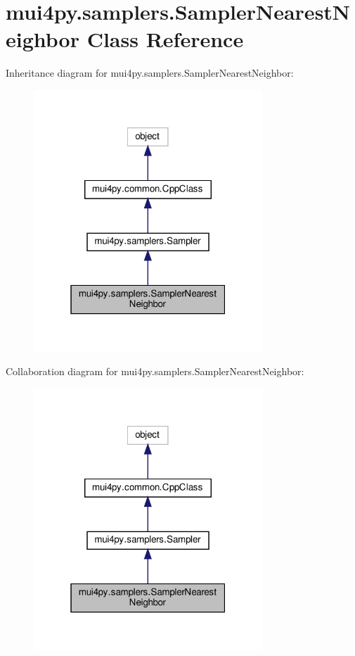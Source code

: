 \hypertarget{classmui4py_1_1samplers_1_1_sampler_nearest_neighbor}{}\section{mui4py.\+samplers.\+Sampler\+Nearest\+Neighbor Class Reference}
\label{classmui4py_1_1samplers_1_1_sampler_nearest_neighbor}


Inheritance diagram for mui4py.\+samplers.\+Sampler\+Nearest\+Neighbor\+:
\nopagebreak
\begin{figure}[H]
\begin{center}
\leavevmode
\includegraphics[width=244pt]{classmui4py_1_1samplers_1_1_sampler_nearest_neighbor__inherit__graph}
\end{center}
\end{figure}


Collaboration diagram for mui4py.\+samplers.\+Sampler\+Nearest\+Neighbor\+:
\nopagebreak
\begin{figure}[H]
\begin{center}
\leavevmode
\includegraphics[width=244pt]{classmui4py_1_1samplers_1_1_sampler_nearest_neighbor__coll__graph}
\end{center}
\end{figure}
